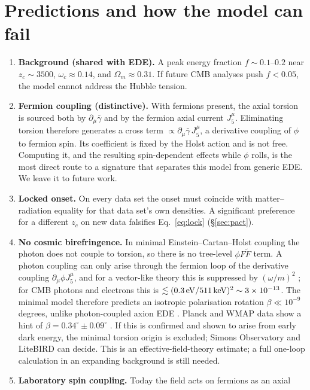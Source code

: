 \documentclass[11pt]{article}
\begin{document}
\section{Predictions and how the model can fail}\label{sec:predictions}
\begin{enumerate}
\item \textbf{Background (shared with EDE).} A peak energy fraction $f\sim0.1$--$0.2$
near $z_c\sim3500$, $\omega_c\approx0.14$, and $\Omega_m\approx0.31$. If future CMB
analyses push $f<0.05$, the model cannot address the Hubble tension.
\item \textbf{Fermion coupling (distinctive).} With fermions present, the axial torsion
is sourced both by $\partial_\mu\bar\gamma$ and by the fermion axial current
$J_5^\mu$. Eliminating torsion therefore generates a cross term
$\propto\partial_\mu\bar\gamma\,J_5^\mu$, a derivative coupling of $\phi$ to fermion
spin. Its coefficient is fixed by the Holst action and is not free. Computing it, and the
resulting spin-dependent effects while $\phi$ rolls, is the most direct route to a
signature that separates this model from generic EDE. We leave it to future work.
\item \textbf{Locked onset.} On every data set the onset must coincide with
matter--radiation equality for that data set's own densities. A significant preference for a
different $z_c$ on new data falsifies Eq.~\eqref{eq:lock} (\S\ref{sec:pact}).
\item \textbf{No cosmic birefringence.} In minimal Einstein--Cartan--Holst coupling the
photon does not couple to torsion, so there is no tree-level $\phi F\tilde F$ term. A
photon coupling can only arise through the fermion loop of the derivative coupling
$\partial_\mu\phi J_5^\mu$, and for a vector-like theory this is suppressed by
$(\omega/m)^2$ \cite{quevillon2019}; for CMB photons and electrons this is
$\lesssim(0.3\,{\rm eV}/511\,{\rm keV})^2\sim3\times10^{-13}$. The minimal model therefore
predicts an isotropic polarisation rotation $\beta\ll10^{-9}$ degrees, unlike photon-coupled
axion EDE \cite{carroll1998,murai2023}. Planck and WMAP data show a hint of
$\beta=0.34^\circ\pm0.09^\circ$ \cite{minami2020,eskilt2022}. If this is confirmed and shown
to arise from early dark energy, the minimal torsion origin is excluded; Simons Observatory
\cite{so2019} and LiteBIRD \cite{litebird2023} can decide. This is an effective-field-theory
estimate; a full one-loop calculation in an expanding background is still needed.
\item \textbf{Laboratory spin coupling.} Today the field acts on fermions as an axial

\end{enumerate}
\end{document}

